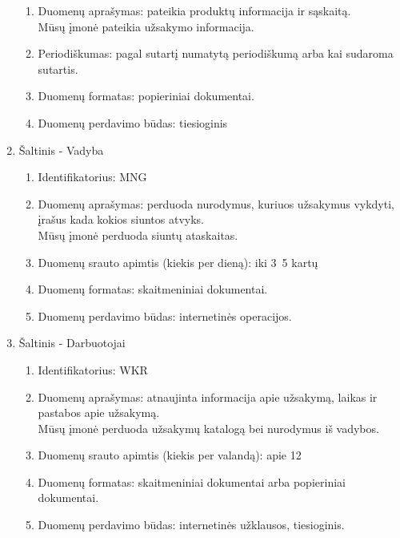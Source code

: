 \documentclass{VUMIFPSkursinis}
\begin{document}
\begin{enumerate}
\begin{enumerate}
		\item Duomenų aprašymas: pateikia produktų informacija ir sąskaitą. \\ Mūsų įmonė pateikia užsakymo informacija.
		\item Periodiškumas: pagal sutartį numatytą periodiškumą arba kai sudaroma sutartis.
		\item Duomenų formatas: popieriniai dokumentai.
		\item Duomenų perdavimo būdas: tiesioginis
	\end{enumerate}
	\item Šaltinis - Vadyba
	\begin{enumerate}
		\item Identifikatorius: MNG
		\item Duomenų aprašymas: perduoda nurodymus, kuriuos užsakymus vykdyti, įrašus kada kokios siuntos atvyks. \\ Mūsų įmonė perduoda siuntų ataskaitas.
 		\item Duomenų srauto apimtis (kiekis per dieną): iki 3~5 kartų
		\item Duomenų formatas: skaitmeniniai dokumentai.
		\item Duomenų perdavimo būdas: internetinės operacijos.
	\end{enumerate}
	\item Šaltinis - Darbuotojai
	\begin{enumerate}
		\item Identifikatorius: WKR
		\item Duomenų aprašymas: atnaujinta informacija apie užsakymą, laikas ir pastabos apie užsakymą. \\ Mūsų įmonė perduoda užsakymų katalogą bei nurodymus iš vadybos.
 		\item Duomenų srauto apimtis (kiekis per valandą): apie 12
		\item Duomenų formatas: skaitmeniniai dokumentai arba popieriniai dokumentai.
		\item Duomenų perdavimo būdas: internetinės užklausos, tiesioginis.
	\end{enumerate}
\end{enumerate}

\newpage
\end{document}
